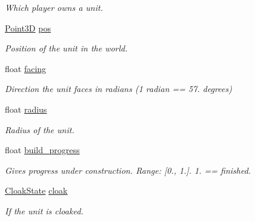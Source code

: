 \begin{DoxyCompactItemize}
\begin{DoxyCompactList}\small\item\em Which player owns a unit. \end{DoxyCompactList}\item 
\mbox{\label{classsc2_1_1_unit_adbe75d15c90712cb1e55e8b8bcbc1319}} 
\hyperlink{structsc2_1_1_point3_d}{Point3D} \hyperlink{classsc2_1_1_unit_adbe75d15c90712cb1e55e8b8bcbc1319}{pos}
\begin{DoxyCompactList}\small\item\em Position of the unit in the world. \end{DoxyCompactList}\item 
\mbox{\label{classsc2_1_1_unit_a9f947f6dffd571c2ab89ddd53609a7f4}} 
float \hyperlink{classsc2_1_1_unit_a9f947f6dffd571c2ab89ddd53609a7f4}{facing}
\begin{DoxyCompactList}\small\item\em Direction the unit faces in radians (1 radian == 57. degrees) \end{DoxyCompactList}\item 
\mbox{\label{classsc2_1_1_unit_a0c2d1fb9e6f150333d96cc8ce8f9e9bf}} 
float \hyperlink{classsc2_1_1_unit_a0c2d1fb9e6f150333d96cc8ce8f9e9bf}{radius}
\begin{DoxyCompactList}\small\item\em Radius of the unit. \end{DoxyCompactList}\item 
\mbox{\label{classsc2_1_1_unit_abb3c46774c4d5dab4d641a4abcf68aba}} 
float \hyperlink{classsc2_1_1_unit_abb3c46774c4d5dab4d641a4abcf68aba}{build\+\_\+progress}
\begin{DoxyCompactList}\small\item\em Gives progress under construction. Range\+: \mbox{[}0., 1.\mbox{]}. 1. == finished. \end{DoxyCompactList}\item 
\mbox{\label{classsc2_1_1_unit_ad06992e99ddf45f28be06550c61fabd4}} 
\hyperlink{classsc2_1_1_unit_a03f99cfaa8ad4f9bba6cd0bc5586c943}{Cloak\+State} \hyperlink{classsc2_1_1_unit_ad06992e99ddf45f28be06550c61fabd4}{cloak}
\begin{DoxyCompactList}\small\item\em If the unit is cloaked. \end{DoxyCompactList}\item 

\end{DoxyCompactItemize}
